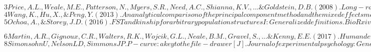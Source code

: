 \documentclass[12pt]{article}
\theoremstyle{definition}
\theoremstyle{plain}
\begin{document}
$
3
Price, A. L., Weale, M. E., Patterson, N., Myers, S. R., Need, A. C., Shianna, K. V., ... \& Goldstein, D. B. (2008). Long-range LD can confound genome scans in admixed populations. The American Journal of Human Genetics, 83(1), 132-135.
$\\

$
4
Wang, K., Hu, X., \& Peng, Y. (2013). An analytical comparison of the principal component method and the mixed effects model for association studies in the presence of cryptic relatedness and population stratification. Human heredity, 76(1), 1-9.
$\\



$
5
Ochoa, A., \& Storey, J. D. (2016). FST and kinship for arbitrary population structures I: Generalized definitions. BioRxiv, 083915.
$

$
6
Martin, A. R., Gignoux, C. R., Walters, R. K., Wojcik, G. L., Neale, B. M., Gravel, S., ... \& Kenny, E. E. (2017). Human demographic history impacts genetic risk prediction across diverse populations. The American Journal of Human Genetics, 100(4), 635-649.
$\\



$
8
Simonsohn U, Nelson L D, Simmons J P. P-curve: a key to the file-drawer[J]. Journal of experimental psychology: General, 2014, 143(2): 534.
$
\end{document}

